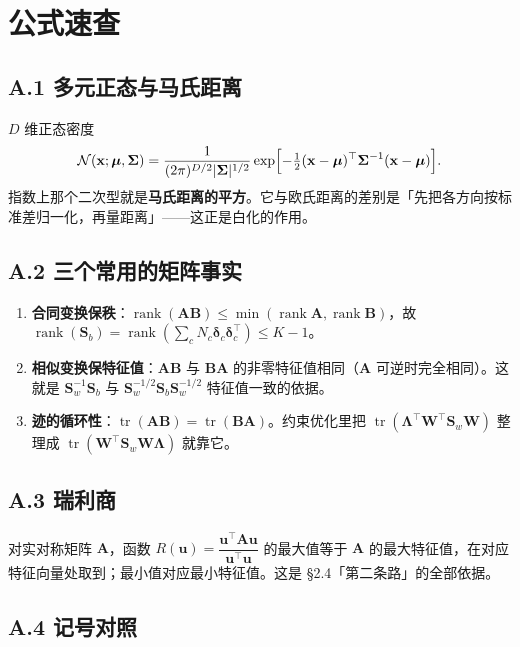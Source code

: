 \documentclass[11pt,a4paper,fontset=windows,zihao=-4]{ctexart}
\newcommand{\bx}{\mathbf{x}}
\newcommand{\bu}{\mathbf{u}}
\newcommand{\bA}{\mathbf{A}}
\newcommand{\bB}{\mathbf{B}}
\newcommand{\bS}{\mathbf{S}}
\newcommand{\bmu}{\boldsymbol{\mu}}
\newcommand{\bW}{\mathbf{W}}
\newcommand{\bSigma}{\boldsymbol{\Sigma}}
\newcommand{\bLambda}{\boldsymbol{\Lambda}}
\newcommand{\bdelta}{\boldsymbol{\delta}}
\newcommand{\tp}{^{\top}}
\DeclareMathOperator{\tr}{tr}
\DeclareMathOperator{\rank}{rank}
\begin{document}
\section{公式速查}

\subsection*{A.1 多元正态与马氏距离}

$D$ 维正态密度
\begin{equation}
  \mathcal{N}(\bx;\bmu,\bSigma)=\frac{1}{(2\pi)^{D/2}\lvert\bSigma\rvert^{1/2}}
  \exp\Bigl[-\tfrac12(\bx-\bmu)\tp\bSigma^{-1}(\bx-\bmu)\Bigr].
\end{equation}
指数上那个二次型就是\textbf{马氏距离的平方}。它与欧氏距离的差别是「先把各方向按标准差归一化，再量距离」——这正是白化的作用。

\subsection*{A.2 三个常用的矩阵事实}

\begin{enumerate}[label=(\arabic*),leftmargin=2.0em]
  \item \textbf{合同变换保秩}：$\rank(\bA\bB)\le\min(\rank\bA,\rank\bB)$，故 $\rank(\bS_b)=\rank(\sum_c N_c\bdelta_c\bdelta_c\tp)\le K-1$。
  \item \textbf{相似变换保特征值}：$\bA\bB$ 与 $\bB\bA$ 的非零特征值相同（$\bA$ 可逆时完全相同）。这就是 $\bS_w^{-1}\bS_b$ 与 $\bS_w^{-1/2}\bS_b\bS_w^{-1/2}$ 特征值一致的依据。
  \item \textbf{迹的循环性}：$\tr(\bA\bB)=\tr(\bB\bA)$。约束优化里把 $\tr(\bLambda\tp\bW\tp\bS_w\bW)$ 整理成 $\tr(\bW\tp\bS_w\bW\bLambda)$ 就靠它。
\end{enumerate}

\subsection*{A.3 瑞利商}

对实对称矩阵 $\bA$，函数 $R(\bu)=\dfrac{\bu\tp\bA\bu}{\bu\tp\bu}$ 的最大值等于 $\bA$ 的最大特征值，在对应特征向量处取到；最小值对应最小特征值。这是 \S2.4「第二条路」的全部依据。

\subsection*{A.4 记号对照}
\end{document}
